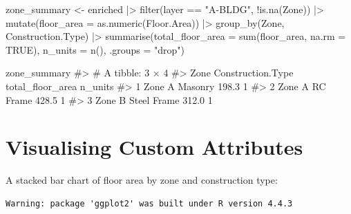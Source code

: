 \documentclass[
  11pt,
  letterpaper,
  DIV=11,
  numbers=noendperiod]{scrreprt}
\newenvironment{Shaded}{\begin{snugshade}}{\end{snugshade}}
\newcommand{\AttributeTok}[1]{\textcolor[rgb]{0.40,0.45,0.13}{#1}}
\newcommand{\CommentTok}[1]{\textcolor[rgb]{0.37,0.37,0.37}{#1}}
\newcommand{\ConstantTok}[1]{\textcolor[rgb]{0.56,0.35,0.01}{#1}}
\newcommand{\FunctionTok}[1]{\textcolor[rgb]{0.28,0.35,0.67}{#1}}
\newcommand{\NormalTok}[1]{\textcolor[rgb]{0.00,0.23,0.31}{#1}}
\newcommand{\OtherTok}[1]{\textcolor[rgb]{0.00,0.23,0.31}{#1}}
\newcommand{\SpecialCharTok}[1]{\textcolor[rgb]{0.37,0.37,0.37}{#1}}
\newcommand{\StringTok}[1]{\textcolor[rgb]{0.13,0.47,0.30}{#1}}
\begin{document}
\begin{Shaded}
\begin{Highlighting}[]
\NormalTok{zone\_summary }\OtherTok{\textless{}{-}}\NormalTok{ enriched }\SpecialCharTok{|\textgreater{}}
  \FunctionTok{filter}\NormalTok{(layer }\SpecialCharTok{==} \StringTok{"A{-}BLDG"}\NormalTok{, }\SpecialCharTok{!}\FunctionTok{is.na}\NormalTok{(Zone)) }\SpecialCharTok{|\textgreater{}}
  \FunctionTok{mutate}\NormalTok{(}\AttributeTok{floor\_area =} \FunctionTok{as.numeric}\NormalTok{(Floor.Area)) }\SpecialCharTok{|\textgreater{}}
  \FunctionTok{group\_by}\NormalTok{(Zone, Construction.Type) }\SpecialCharTok{|\textgreater{}}
  \FunctionTok{summarise}\NormalTok{(}\AttributeTok{total\_floor\_area =} \FunctionTok{sum}\NormalTok{(floor\_area, }\AttributeTok{na.rm =} \ConstantTok{TRUE}\NormalTok{),}
            \AttributeTok{n\_units          =} \FunctionTok{n}\NormalTok{(),}
            \AttributeTok{.groups          =} \StringTok{"drop"}\NormalTok{)}

\NormalTok{zone\_summary}
\CommentTok{\#\textgreater{} \# A tibble: 3 × 4}
\CommentTok{\#\textgreater{}   Zone   Construction.Type total\_floor\_area n\_units}
\CommentTok{\#\textgreater{} 1 Zone A Masonry                      198.3       1}
\CommentTok{\#\textgreater{} 2 Zone A RC Frame                     428.5       1}
\CommentTok{\#\textgreater{} 3 Zone B Steel Frame                  312.0       1}
\end{Highlighting}
\end{Shaded}

\section{Visualising Custom
Attributes}\label{visualising-custom-attributes}

A stacked bar chart of floor area by zone and construction type:

\begin{verbatim}
Warning: package 'ggplot2' was built under R version 4.4.3
\end{verbatim}
\end{document}
